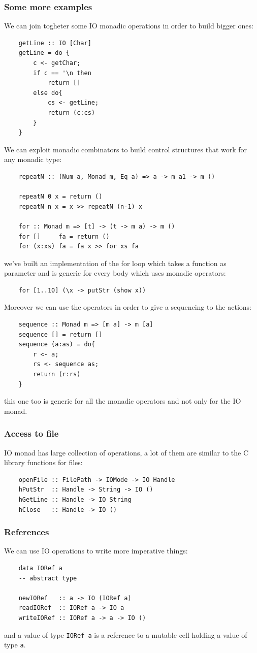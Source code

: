 \subsubsection{Some more examples}
We can join togheter some IO monadic operations in order to build bigger ones:
\begin{verbatim}
    getLine :: IO [Char]
    getLine = do {
        c <- getChar;
        if c == '\n then
            return []
        else do{
            cs <- getLine;
            return (c:cs)
        }
    }
\end{verbatim}

We can exploit monadic combinators to build control structures that work for any monadic type:
\begin{verbatim}
    repeatN :: (Num a, Monad m, Eq a) => a -> m a1 -> m ()

    repeatN 0 x = return ()
    repeatN n x = x >> repeatN (n-1) x

    for :: Monad m => [t] -> (t -> m a) -> m ()
    for []     fa = return ()
    for (x:xs) fa = fa x >> for xs fa
\end{verbatim}
we've built an implementation of the for loop which takes a function as parameter and is generic for every body which uses monadic operators:
\begin{verbatim}
    for [1..10] (\x -> putStr (show x))
\end{verbatim}

Moreover we can use the operators in order to give a sequencing to the actions:
\begin{verbatim}
    sequence :: Monad m => [m a] -> m [a]
    sequence [] = return []
    sequence (a:as) = do{
        r <- a;
        rs <- sequence as;
        return (r:rs)
    }
\end{verbatim}
this one too is generic for all the monadic operators and not only for the IO monad.

\subsubsection{Access to file}
IO monad has large collection of operations, a lot of them are similar to the C library functions for files:
\begin{verbatim}
    openFile :: FilePath -> IOMode -> IO Handle
    hPutStr  :: Handle -> String -> IO ()
    hGetLine :: Handle -> IO String
    hClose   :: Handle -> IO ()
\end{verbatim}

\subsubsection{References}
We can use IO operations to write more imperative things:
\begin{verbatim}
    data IORef a
    -- abstract type

    newIORef   :: a -> IO (IORef a)
    readIORef  :: IORef a -> IO a
    writeIORef :: IORef a -> a -> IO ()
\end{verbatim}
and a value of type \verb|IORef a| is a reference to a mutable cell holding a value of type \verb|a|.

